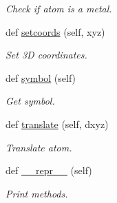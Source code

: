 \begin{DoxyCompactItemize}
\begin{DoxyCompactList}\small\item\em Check if atom is a metal. \end{DoxyCompactList}\item 
def \hyperlink{classmolSimplify_1_1Classes_1_1atom3D_1_1atom3D_a402fcb74044e61763e222b07f8a5034b}{setcoords} (self, xyz)
\begin{DoxyCompactList}\small\item\em Set 3D coordinates. \end{DoxyCompactList}\item 
def \hyperlink{classmolSimplify_1_1Classes_1_1atom3D_1_1atom3D_ab41e824da37c3ea6736d6804ff5f6dab}{symbol} (self)
\begin{DoxyCompactList}\small\item\em Get symbol. \end{DoxyCompactList}\item 
def \hyperlink{classmolSimplify_1_1Classes_1_1atom3D_1_1atom3D_a3ea82ed2cf89b616bae2088e4052a2c3}{translate} (self, dxyz)
\begin{DoxyCompactList}\small\item\em Translate atom. \end{DoxyCompactList}\item 
def \hyperlink{classmolSimplify_1_1Classes_1_1atom3D_1_1atom3D_af9c198e9298a466dc70ec39318c9407e}{\+\_\+\+\_\+repr\+\_\+\+\_\+} (self)
\begin{DoxyCompactList}\small\item\em Print methods. \end{DoxyCompactList}\end{DoxyCompactItemize}
